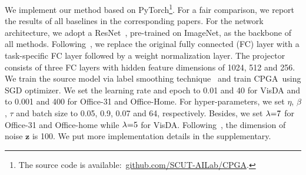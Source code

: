 \documentclass{article}
\def\ournet{CPGA}
\begin{document}
We implement our method based on PyTorch\footnote{The source code is available:~\url{github.com/SCUT-AILab/CPGA}.}. For a fair comparison, we report the results of all baselines in the corresponding papers.
For the network architecture, we adopt a ResNet~\cite{He2016DeepRL}, pre-trained on ImageNet, as the backbone of all methods. Following~\cite{liang2020shot}, we replace the original fully connected (FC) layer with a task-specific FC layer followed by a weight normalization layer. 
The projector consists of three FC layers with hidden feature dimensions of 1024, 512 and 256.
We train the source model via label smoothing technique~\cite{Mller2019WhenDL} and  train \ournet~using SGD optimizer.
We set the learning rate and epoch to 0.01 and 40 for VisDA and to 0.001 and 400 for Office-31 and Office-Home.
For hyper-parameters, we set $\eta$, $\beta$, $\tau$ and batch size to 0.05, 0.9, 0.07 and 64, respectively. Besides, we set $\lambda \small{=}7$ for Office-31 and Office-home while $\lambda \small{=} 5$ for VisDA. Following~\cite{Xu2020GenerativeLD}, the dimension of noise $\textbf{z}$ is 100.
We put more implementation details in the supplementary.
\end{document}

